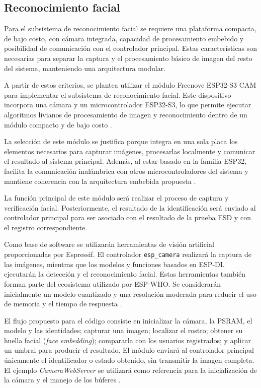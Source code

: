 \subsection{Reconocimiento facial}

Para el subsistema de reconocimiento facial se requiere una plataforma compacta,
de bajo costo, con cámara integrada, capacidad de procesamiento embebido y
posibilidad de comunicación con el controlador principal. Estas características
son necesarias para separar la captura y el procesamiento básico de imagen del
resto del sistema, manteniendo una arquitectura modular.

A partir de estos criterios, se plantea utilizar el módulo Freenove ESP32-S3 CAM
para implementar el subsistema de reconocimiento facial. Este dispositivo
incorpora una cámara y un microcontrolador ESP32-S3, lo que permite ejecutar
algoritmos livianos de procesamiento de imagen y reconocimiento dentro de un
módulo compacto y de bajo costo \cite{esp32s3}.

La selección de este módulo se justifica porque integra en una sola placa los
elementos necesarios para capturar imágenes, procesarlas localmente y comunicar
el resultado al sistema principal. Además, al estar basado en la familia ESP32,
facilita la comunicación inalámbrica con otros microcontroladores del sistema y
mantiene coherencia con la arquitectura embebida propuesta
\cite{FreenoveESP32S3CAM}.

La función principal de este módulo será realizar el proceso de captura y
verificación facial. Posteriormente, el resultado de la identificación será
enviado al controlador principal para ser asociado con el resultado de la prueba
ESD y con el registro correspondiente.

Como base de software se utilizarán herramientas de visión artificial
proporcionadas por Espressif. El controlador \texttt{esp\_camera} realizará la
captura de las imágenes, mientras que los modelos y funciones basados en ESP-DL
ejecutarán la detección y el reconocimiento facial. Estas herramientas también
forman parte del ecosistema utilizado por ESP-WHO. Se considerarán inicialmente
un modelo cuantizado y una resolución moderada para reducir el uso de memoria y
el tiempo de respuesta \cite{ESPWHO,ESPDLGuide,ESP32Camera}.

El flujo propuesto para el código consiste en inicializar la cámara, la PSRAM,
el modelo y las identidades; capturar una imagen; localizar el rostro; obtener
su huella facial (\textit{face embedding}); compararla con los usuarios
registrados; y aplicar un umbral para producir el resultado. El módulo enviará
al controlador principal únicamente el identificador o estado obtenido, sin
transmitir la imagen completa. El ejemplo \textit{CameraWebServer} se utilizará
como referencia para la inicialización de la cámara y el manejo de los búferes
\cite{ArduinoCameraWebServer}.

